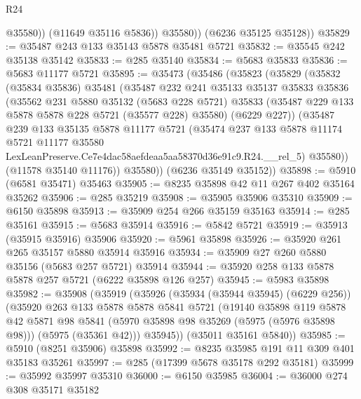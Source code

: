 \begin{lexlean}{R24}
\begin{coremodule}
                @35580))
            (@11649 @35116 @5836))
          @35580))
      (@6236 @35125 @35128))
@35829 := @35487 @243 @133 @35143 @5878 @35481 @5721
@35832 := @35545 @242 @35138 @35142
@35833 := @285 @35140
@35834 := @5683 @35833
@35836 := @5683 @11177 @5721
@35895 := @35473
    (@35486
      (@35823
        (@35829
          (@35832
            (@35834 @35836)
            @35481
            (@35487
              @232
              @241
              @35133
              @35137
              @35833
              @35836
              (@35562
                @231
                @5880
                @35132
                (@5683 @228 @5721)
                @35833
                (@35487 @229 @133 @5878 @5878 @228 @5721 (@35577 @228) @35580)
                (@6229 @227))
              (@35487
                @239
                @133
                @35135
                @5878
                @11177
                @5721
                (@35474
                  @237
                  @133
                  @5878
                  @11174
                  @5721
                  @11177
                  @35580
                  LexLeanPreserve.Ce7e4dac58aefdeaa5aa58370d36e91c9.R24.__rel_5)
                @35580))
            (@11578 @35140 @11176))
          @35580))
      (@6236 @35149 @35152))
@35898 := @5910 (@6581 @35471) @35463
@35905 := @8235 @35898 @42 @11 @267 @402 @35164 @35262
@35906 := @285 @35219
@35908 := @35905 @35906 @35310
@35909 := @6150 @35898
@35913 := @35909 @254 @266 @35159 @35163
@35914 := @285 @35161
@35915 := @5683 @35914
@35916 := @5842 @5721
@35919 := @35913 (@35915 @35916) @35906
@35920 := @5961 @35898
@35926 := @35920 @261 @265 @35157 @5880 @35914 @35916
@35934 := @35909 @27 @260 @5880 @35156 (@5683 @257 @5721) @35914
@35944 := @35920 @258 @133 @5878 @5878 @257 @5721 (@6222 @35898 @126 @257)
@35945 := @5983 @35898
@35982 := @35908
    (@35919
      (@35926
        (@35934 (@35944 @35945) (@6229 @256))
        (@35920
          @263
          @133
          @5878
          @5878
          @5841
          @5721
          (@19140
            @35898
            @119
            @5878
            @42
            @5871
            @98
            @5841
            (@5970 @35898 @98 @35269 (@5975 (@5976 @35898 @98)))
            (@5975 (@35361 @42)))
          @35945))
      (@35011 @35161 @5840))
@35985 := @5910 (@8251 @35906) @35898
@35992 := @8235 @35985 @191 @11 @309 @401 @35183 @35261
@35997 := @285 (@17399 @5678 @35178 @292 @35181)
@35999 := @35992 @35997 @35310
@36000 := @6150 @35985
@36004 := @36000 @274 @308 @35171 @35182

\end{coremodule}
\end{lexlean}
